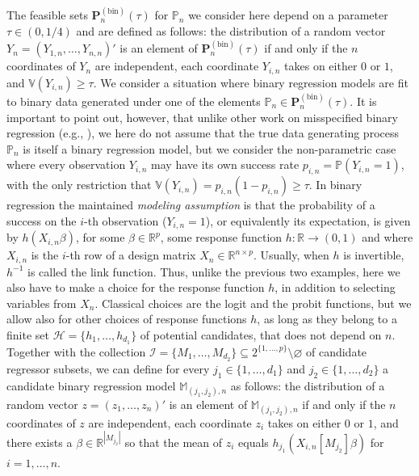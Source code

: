 \documentclass[preprint]{imsart}
\newcommand{\R}{{\mathbb R}}
\newcommand{\V}{{\mathbb V}}
\renewcommand{\P}{{\mathbb P}}
\numberwithin{equation}{section}
\begin{document}
The feasible sets $\mathbf{P}_n^{(\mathrm{bin})}(\tau)$ for $\P_n$ we consider here depend on a parameter $\tau \in (0,1/4)$ and are defined as follows: the distribution of a random vector $Y_n = (Y_{1,n}, \hdots, Y_{n,n})'$ is an element of $\mathbf{P}_n^{(\mathrm{bin})}(\tau)$ if and only if the $n$ coordinates of $Y_n$ are independent, each coordinate $Y_{i,n}$ takes on either $0$ or $1$, and $\V(Y_{i,n})\ge \tau$.
%
%
%
We consider a situation where binary regression models are fit to binary data generated under one of the elements $\P_n\in \mathbf{P}_n^{(\mathrm{bin})}(\tau)$. It is important to point out, however, that unlike other work on misspecified binary regression (e.g., \cite{Ruud83, Kub17}), we here do not assume that the true data generating process $\P_n$ is itself a binary regression model, but we consider the non-parametric case where every observation $Y_{i,n}$ may have its own success rate $p_{i,n} = \P(Y_{i,n}=1)$, with the only restriction that $\V(Y_{i,n}) = p_{i,n}(1-p_{i,n})\ge \tau$. In binary regression the maintained \emph{modeling assumption} is that the probability of a success on the $i$-th observation ($Y_{i,n}=1$), or equivalently its expectation, is given by $h(X_{i,n}\beta)$, for some $\beta\in\R^p$, some response function $h:\R\to (0,1)$ and where $X_{i,n}$ is the $i$-th row of a design matrix $X_n\in\R^{n\times p}$. Usually, when $h$ is invertible, $h^{-1}$ is called the link function. Thus, unlike the previous two examples, here we also have to make a choice for the response function $h$, in addition to selecting variables from $X_n$. Classical choices are the logit and the probit functions, but we allow also for other choices of response functions $h$, as long as they belong to a finite set $\mathcal H = \{h_1,\dots, h_{d_1}\}$ of potential candidates, that does not depend on $n$. Together with the collection $\mathcal I = \{M_1,\dots, M_{d_2}\}\subseteq 2^{\{1,\dots, p\}}\setminus\varnothing$ of candidate regressor subsets, we can define for every $j_1\in\{1,\dots, d_1\}$ and $j_2\in\{1,\dots, d_2\}$ a candidate binary regression model $\mathbb M_{(j_1,j_2),n}$ as follows: the distribution of a random vector $z = (z_1, \hdots, z_n)'$ is an element of $\mathbb M_{(j_1,j_2),n}$ if and only if the $n$ coordinates of $z$ are independent, each coordinate $z_i$ takes on either $0$ or $1$, and there exists a $\beta \in \R^{|M_{j_2}|}$ so that the mean of $z_i$ equals $h_{j_1}(X_{i,n}[M_{j_2}]\beta)$ for $i = 1, \hdots, n$.
\end{document}
